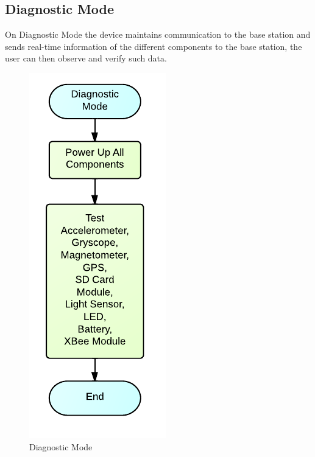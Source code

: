 \subsection{Diagnostic Mode}
On Diagnostic Mode the device maintains communication to the base station and sends real-time information of the different components to the base station, the user can then observe and verify such data.
\begin{figure}[H]
	\centering
	\includegraphics[scale=1.0]{img/DiagnosticMode}
	\caption{Diagnostic Mode \label{fig:diagnosticMode}}
\end{figure}

